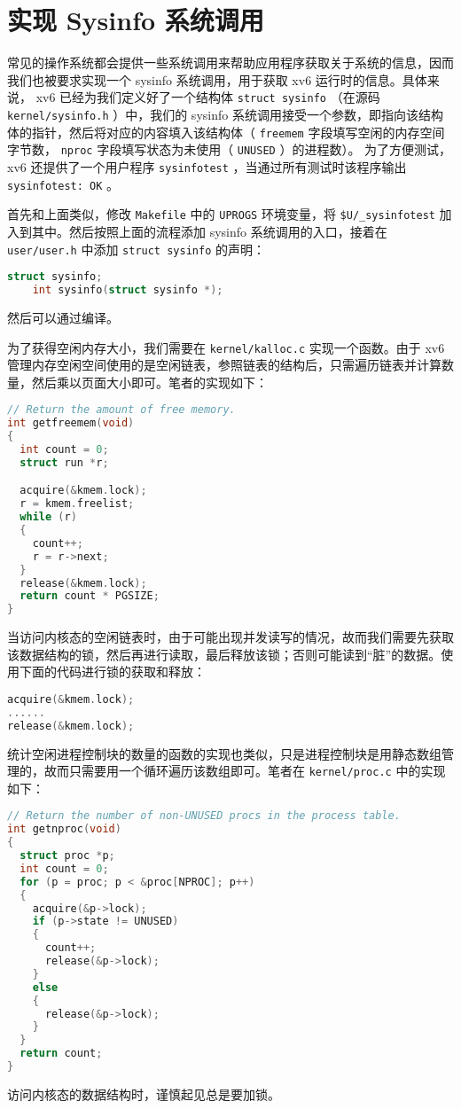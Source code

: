 \section{实现 Sysinfo 系统调用}

常见的操作系统都会提供一些系统调用来帮助应用程序获取关于系统的信息，因而我们也被要求实现一个 sysinfo 系统调用，用于获取 xv6 运行时的信息。具体来说， xv6 已经为我们定义好了一个结构体 \lstinline{struct sysinfo} （在源码 \lstinline{kernel/sysinfo.h} ）中，我们的 sysinfo 系统调用接受一个参数，即指向该结构体的指针，然后将对应的内容填入该结构体（ \lstinline{freemem} 字段填写空闲的内存空间字节数， \lstinline{nproc} 字段填写状态为未使用（ \lstinline{UNUSED} ）的进程数）。 为了方便测试， xv6 还提供了一个用户程序 \lstinline{sysinfotest} ，当通过所有测试时该程序输出 \lstinline{sysinfotest: OK} 。

首先和上面类似，修改 \lstinline{Makefile} 中的 \lstinline{UPROGS} 环境变量，将 \lstinline{$U/_sysinfotest} 加入到其中。然后按照上面的流程添加 sysinfo 系统调用的入口，接着在 \lstinline{user/user.h} 中添加 \lstinline{struct sysinfo} 的声明：
\begin{lstlisting}[language=C,escapechar={!}]
    struct sysinfo;
    int sysinfo(struct sysinfo *);
\end{lstlisting}
然后可以通过编译。

为了获得空闲内存大小，我们需要在 \lstinline{kernel/kalloc.c} 实现一个函数。由于 xv6 管理内存空闲空间使用的是空闲链表，参照链表的结构后，只需遍历链表并计算数量，然后乘以页面大小即可。笔者的实现如下：
\begin{lstlisting}[language=C,escapechar={!}]
// Return the amount of free memory.
int getfreemem(void)
{
  int count = 0;
  struct run *r;

  acquire(&kmem.lock);
  r = kmem.freelist;
  while (r)
  {
    count++;
    r = r->next;
  }
  release(&kmem.lock);
  return count * PGSIZE;
}
\end{lstlisting}
\begin{theorem}[注意加锁] 
    当访问内核态的空闲链表时，由于可能出现并发读写的情况，故而我们需要先获取该数据结构的锁，然后再进行读取，最后释放该锁；否则可能读到“脏”的数据。使用下面的代码进行锁的获取和释放：
\begin{lstlisting}[language=C,escapechar={!}]   
acquire(&kmem.lock);
......
release(&kmem.lock);
\end{lstlisting}
\end{theorem}

统计空闲进程控制块的数量的函数的实现也类似，只是进程控制块是用静态数组管理的，故而只需要用一个循环遍历该数组即可。笔者在 \lstinline{kernel/proc.c} 中的实现如下：
\begin{lstlisting}[language=C]
// Return the number of non-UNUSED procs in the process table.
int getnproc(void)
{
  struct proc *p;
  int count = 0;
  for (p = proc; p < &proc[NPROC]; p++)
  {
    acquire(&p->lock);
    if (p->state != UNUSED)
    {
      count++;
      release(&p->lock);
    }
    else
    {
      release(&p->lock);
    }
  }
  return count;
}
\end{lstlisting}
\begin{theorem}[同样注意加锁] 
    访问内核态的数据结构时，谨慎起见总是要加锁。
\end{theorem}

